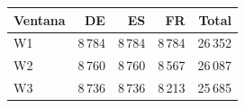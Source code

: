 \begin{tabular}{lrrrr}
\toprule
Ventana & DE & ES & FR & Total \\
\midrule
W1 & 8\,784 & 8\,784 & 8\,784 & 26\,352 \\
W2 & 8\,760 & 8\,760 & 8\,567 & 26\,087 \\
W3 & 8\,736 & 8\,736 & 8\,213 & 25\,685 \\
\bottomrule
\end{tabular}
